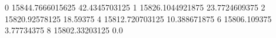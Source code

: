 0 15844.7666015625 42.4345703125
1 15826.1044921875 23.7724609375
2 15820.92578125 18.59375
4 15812.720703125 10.388671875
6 15806.109375 3.77734375
8 15802.33203125 0.0
